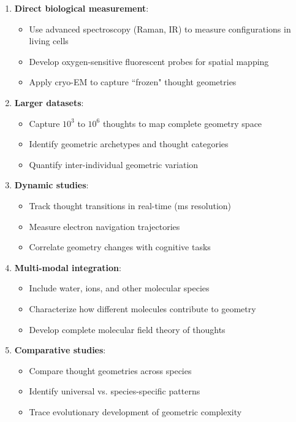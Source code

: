 \documentclass[11pt]{article}
\theoremstyle{remark}
\begin{document}
\begin{enumerate}
\item \textbf{Direct biological measurement}:
   \begin{itemize}
   \item Use advanced spectroscopy (Raman, IR) to measure  configurations in living cells
   \item Develop oxygen-sensitive fluorescent probes for spatial mapping
   \item Apply cryo-EM to capture ``frozen" thought geometries
   \end{itemize}

\item \textbf{Larger datasets}:
   \begin{itemize}
   \item Capture $10^3$ to $10^6$ thoughts to map complete geometry space
   \item Identify geometric archetypes and thought categories
   \item Quantify inter-individual geometric variation
   \end{itemize}

\item \textbf{Dynamic studies}:
   \begin{itemize}
   \item Track thought transitions in real-time (ms resolution)
   \item Measure electron navigation trajectories
   \item Correlate geometry changes with cognitive tasks
   \end{itemize}

\item \textbf{Multi-modal integration}:
   \begin{itemize}
   \item Include water, ions, and other molecular species
   \item Characterize how different molecules contribute to geometry
   \item Develop complete molecular field theory of thoughts
   \end{itemize}

\item \textbf{Comparative studies}:
   \begin{itemize}
   \item Compare thought geometries across species
   \item Identify universal vs. species-specific patterns
   \item Trace evolutionary development of geometric complexity
   \end{itemize}
\end{enumerate}
\end{document}
